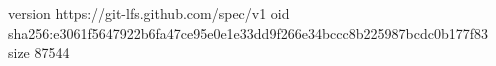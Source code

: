 version https://git-lfs.github.com/spec/v1
oid sha256:e3061f5647922b6fa47ce95e0e1e33dd9f266e34bccc8b225987bcdc0b177f83
size 87544
